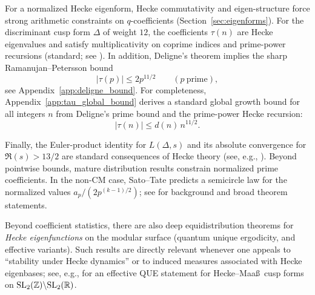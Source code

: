 For a normalized Hecke eigenform, Hecke commutativity and eigen-structure force strong arithmetic constraints on $q$-coefficients (Section~\ref{sec:eigenforms}). For the discriminant cusp form $\Delta$ of weight $12$, the coefficients $\tau(n)$ are Hecke eigenvalues and satisfy multiplicativity on coprime indices and prime-power recursions (standard; see \cite{Serre1973,Apostol1990,DiamondShurman2005}). In addition, Deligne's theorem implies the sharp Ramanujan--Petersson bound
\begin{equation}
|\tau(p)|\le 2p^{11/2}\qquad (p\ \text{prime}),
\end{equation}
see Appendix~\ref{app:deligne_bound}.
For completeness, Appendix~\ref{app:tau_global_bound} derives a standard global growth bound for all integers $n$ from Deligne's prime bound and the prime-power Hecke recursion:
\begin{equation}
|\tau(n)|\le d(n)\,n^{11/2}.
\end{equation}
\par
Finally, the Euler-product identity for $L(\Delta,s)$ and its absolute convergence for $\Re(s)>13/2$ are standard consequences of Hecke theory (see, e.g., \cite{Serre1973,Apostol1990,DiamondShurman2005}). Beyond pointwise bounds, mature distribution results constrain normalized prime coefficients. In the non-CM case, Sato--Tate predicts a semicircle law for the normalized values $a_p/(2p^{(k-1)/2})$; see \cite{Clozel2006SatoTate,Harris2014SatoTate,BarnetLambGeeGeraghty2011} for background and broad theorem statements.
\par
Beyond coefficient statistics, there are also deep equidistribution theorems for \emph{Hecke eigenfunctions} on the modular surface (quantum unique ergodicity, and effective variants). Such results are directly relevant whenever one appeals to ``stability under Hecke dynamics'' or to induced measures associated with Hecke eigenbases; see, e.g., \cite{BisainHumphriesMandelstamWalshWang2024EffectiveQUE} for an effective QUE statement for Hecke--Maa\ss\ cusp forms on $\mathrm{SL}_2(\mathbb{Z})\backslash\mathrm{SL}_2(\mathbb{R})$.


